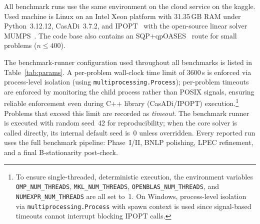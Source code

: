 All benchmark runs use the same environment on the cloud service on the kaggle. Used machine is Linux on an Intel Xeon platform with 31.35\,GB RAM
under Python~3.12.12, CasADi~3.7.2, and IPOPT~\cite{WachterBiegler2006}
with the open-source linear solver MUMPS~\cite{Amestoy2001}. The code
base also contains an SQP$+$qpOASES~\cite{Ferreau2014qpOASES} route for
small problems ($n \leq 400$).

The benchmark-runner configuration used throughout all benchmarks is
listed in Table~\ref{tab:params}. A per-problem wall-clock time limit
of 3600\,s is enforced via process-level isolation (using
\texttt{multiprocessing.Process}); per-problem timeouts are enforced by
monitoring the child process rather than POSIX signals, ensuring
reliable enforcement even during C++ library (CasADi/IPOPT)
execution.\footnote{%
  To ensure single-threaded, deterministic execution, the environment
  variables \texttt{OMP\_NUM\_THREADS}, \texttt{MKL\_NUM\_THREADS},
  \texttt{OPENBLAS\_NUM\_THREADS}, and \texttt{NUMEXPR\_NUM\_THREADS}
  are all set to~1. On Windows, process-level isolation via \texttt{multiprocessing.Process} with spawn context is used since signal-based timeouts cannot interrupt blocking IPOPT calls.}
Problems that exceed this limit are recorded as \emph{timeout}.
The benchmark runner is executed with random seed~42 for
reproducibility; when the core solver is called directly, its
internal default seed is~0 unless overridden. Every reported run uses
the full benchmark pipeline: Phase~I/II, BNLP polishing, LPEC
refinement, and a final B-stationarity post-check.

